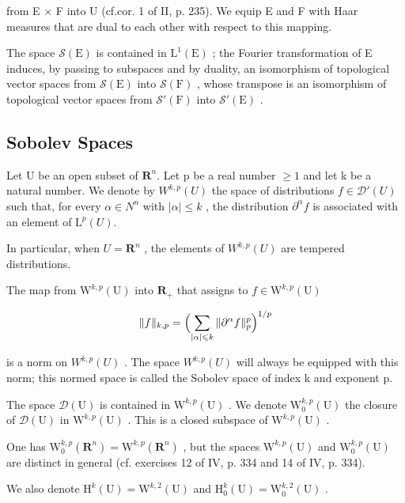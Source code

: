 from E × F into U (cf.cor. 1 of II, p. 235). We equip E and F with Haar measures that are dual to each other with respect to this mapping.

The space \(\mathcal{S}(\mathrm{E})\) is contained in \(\mathrm{L}^1 (\mathrm{E})\) ; the Fourier transformation of E induces, by passing to subspaces and by duality, an isomorphism of topological vector spaces from \(\mathcal{S}(\mathrm{E})\) into \(\mathcal{S}(\mathrm{F})\) , whose transpose is an isomorphism of topological vector spaces from \(\mathcal{S}'(\mathrm{F})\) into \(\mathcal{S}'(\mathrm{E})\) .

\subsection{Sobolev Spaces}

Let U be an open subset of \(\mathbf{R}^{n} \). Let p be a real number \(\geqslant 1\) and let k be a natural number. We denote by \(W^{k,p}(U)\) the space of distributions \(f \in \mathcal{D}'(U)\) such that, for every \(\alpha \in N^{n}\) with \(|\alpha| \leqslant k\) , the distribution \(\partial^{\alpha}f\) is associated with an element of \(\mathrm{L}^{p}(U) \).

In particular, when \(U = \mathbf{R}^{n}\) , the elements of \(W^{k,p}(U)\) are tempered distributions.

The map from \(\mathrm{W}^{k,p}(\mathrm{U})\) into \(\mathbf{R}_{+}\) that assigns to \(f\in \mathrm{W}^{k,p}(\mathrm{U})\)

\[
\| f \| _ {k, p} = \Bigl (\sum_ {| \alpha | \leqslant k} \| \partial^ {\alpha} f \| _ {p} ^ {p} \Bigr) ^ {1 / p}
\]

is a norm on \(W^{k,p}(U)\) . The space \(W^{k,p}(U)\) will always be equipped with this norm; this normed space is called the Sobolev space of index k and exponent p.

The space \(\mathcal{D}(\mathrm{U})\) is contained in \(\mathrm{W}^{k,p}(\mathrm{U})\) . We denote \(\mathrm{W}_0^{k,p}(\mathrm{U})\) the closure of \(\mathcal{D}(\mathrm{U})\) in \(\mathrm{W}^{k,p}(\mathrm{U})\) . This is a closed subspace of \(\mathrm{W}^{k,p}(\mathrm{U})\) .

One has \(\mathrm{W}_{0}^{k,p}(\mathbf{R}^{n})=\mathrm{W}^{k,p}(\mathbf{R}^{n})\) , but the spaces \(\mathrm{W}^{k,p}(\mathrm{U})\) and \(\mathrm{W}_{0}^{k,p}(\mathrm{U})\) are distinct in general (cf. exercises 12 of IV, p. 334 and 14 of IV, p. 334).

We also denote \(\mathrm{H}^k (\mathrm{U}) = \mathrm{W}^{k,2}(\mathrm{U})\) and \(\mathrm{H}_0^k (\mathrm{U}) = \mathrm{W}_0^{k,2}(\mathrm{U})\) .


